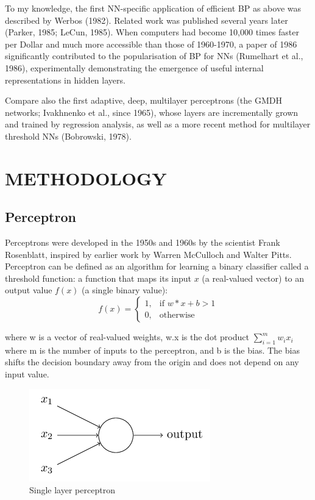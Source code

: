\documentclass[a4paper,12pt]{report}
\begin{document}
To my knowledge, the first NN-specific application of efficient BP as above was described by Werbos (1982). Related work was published several years later (Parker, 1985; LeCun, 1985). When computers had become 10,000 times faster per Dollar and much more accessible than those of 1960-1970, a paper of 1986 significantly contributed to the popularisation of BP for NNs (Rumelhart et al., 1986), experimentally demonstrating the emergence of useful internal representations in hidden layers.

Compare also the first adaptive, deep, multilayer perceptrons (the GMDH networks; Ivakhnenko et al., since 1965), whose layers are incrementally grown and trained by regression analysis, as well as a more recent method for multilayer threshold NNs (Bobrowski, 1978).

\chapter{METHODOLOGY}
\section{Perceptron}
Perceptrons were developed in the 1950s and 1960s by the scientist Frank Rosenblatt, inspired by earlier work by Warren McCulloch and Walter Pitts.
Perceptron can be defined as an algorithm for learning a binary classifier called a threshold function: a function that maps its input 
$x$ (a real-valued vector) to an output value $f(x)$ (a single binary value):
\begin{equation}
f(x)=
\begin{cases}
    1,& \text{if } w*x+b > 1\\
    0,              & \text{otherwise}
\end{cases}
\end{equation}

where w  is a vector of real-valued weights, w.x is the dot product $\sum_{i=1}^m w_i x_i$ where m is the number of inputs to the perceptron, and b is the bias. The bias shifts the decision boundary away from the origin and does not depend on any input value.

\begin{figure}[htp]
\centering
\includegraphics[scale=0.300]{resources/image-01.png}
\caption{Single layer perceptron}
\label{}
\end{figure}
\end{document}
